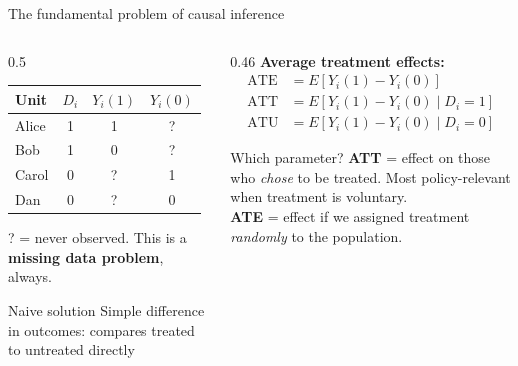 \documentclass[aspectratio=169, 10pt]{beamer}
\begin{document}
\begin{frame}{The fundamental problem of causal inference}

  \begin{columns}[T]
    \begin{column}{0.5\textwidth}
      \begin{tabular}{lccc}
        \toprule
        Unit & $D_i$ & $Y_i(1)$ & $Y_i(0)$ \\
        \midrule
        Alice  & 1 & 1 & \alert{?} \\
        Bob    & 1 & 0 & \alert{?} \\
        Carol  & 0 & \alert{?} & 1 \\
        Dan    & 0 & \alert{?} & 0 \\
        \bottomrule
      \end{tabular}

      \vspace{4mm}
      \small \alert{?} = never observed. This is a \textbf{missing data problem}, always.
      \vspace{2mm}
      \begin{block}{Naive solution}
        Simple difference in outcomes: compares treated to untreated directly
      \end{block}
    \end{column}
    \begin{column}{0.46\textwidth}
      \textbf{Average treatment effects:}
      \begin{align*}
        \text{ATE} &= E[Y_i(1) - Y_i(0)] \\[4pt]
        \text{ATT} &= E[Y_i(1) - Y_i(0) \mid D_i = 1] \\[4pt]
        \text{ATU} &= E[Y_i(1) - Y_i(0) \mid D_i = 0]
      \end{align*}

      \vspace{2mm}
      \begin{block}{Which parameter?}
        \textbf{ATT} = effect on those who \emph{chose} to be treated. Most policy-relevant when treatment is voluntary.\\[2pt]
        \textbf{ATE} = effect if we assigned treatment \emph{randomly} to the population.
      \end{block}
    \end{column}
  \end{columns}
\end{frame}

\end{document}
